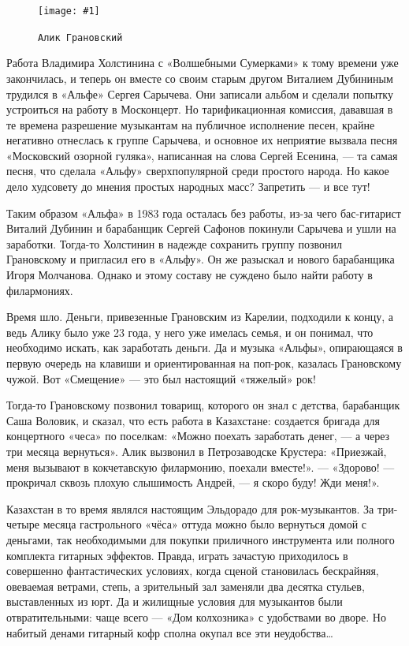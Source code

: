\documentclass[16pt,a5paper]{book}
\newcommand{\myincludegraphics}[1]{\texttt{[image: \#1]}}
\begin{document}
\begin{figure}
    \centering
    \myincludegraphics{Image09}
    \caption{\texttt{Алик Грановский}}
\end{figure}

Работа Владимира Холстинина с «Волшебными Сумерками» к тому времени уже закончилась, и теперь он вместе со своим старым
другом Виталием Дубининым трудился в «Альфе» Сергея Сарычева. Они записали альбом и сделали попытку устроиться на работу
в Москонцерт. Но тарификационная комиссия, дававшая в те времена разрешение музыкантам на публичное исполнение песен,
крайне негативно отнеслась к группе Сарычева, и основное их неприятие вызвала песня «Московский озорной гуляка»,
написанная на слова Сергей Есенина, — та самая песня, что сделала «Альфу» сверхпопулярной среди простого народа. Но
какое дело худсовету до мнения простых народных масс? Запретить — и все тут!

Таким образом «Альфа» в 1983 года осталась без работы, из-за чего бас-гитарист Виталий Дубинин и барабанщик Сергей
Сафонов покинули Сарычева и ушли на заработки. Тогда-то Холстинин в надежде сохранить группу позвонил Грановскому и
пригласил его в «Альфу». Он же разыскал и нового барабанщика Игоря Молчанова. Однако и этому составу не суждено было
найти работу в филармониях.

Время шло. Деньги, привезенные Грановским из Карелии, подходили к концу, а ведь Алику было уже 23 года, у него уже
имелась семья, и он понимал, что необходимо искать, как заработать деньги. Да и музыка «Альфы», опирающаяся в первую
очередь на клавиши и ориентированная на поп-рок, казалась Грановскому чужой. Вот «Смещение» — это был настоящий
«тяжелый» рок!

Тогда-то Грановскому позвонил товарищ, которого он знал с детства, барабанщик Саша Воловик, и сказал, что есть работа в
Казахстане: создается бригада для концертного «чеса» по поселкам: «Можно поехать заработать денег, — а через три месяца
вернуться». Алик вызвонил в Петрозаводске Крустера: «Приезжай, меня вызывают в кокчетавскую филармонию, поехали
вместе!». — «Здорово! — прокричал сквозь плохую слышимость Андрей, — я скоро буду! Жди меня!».

Казахстан в то время являлся настоящим Эльдорадо для рок-музыкантов. За три-четыре месяца гастрольного «чёса» оттуда
можно было вернуться домой с деньгами, так необходимыми для покупки приличного инструмента или полного комплекта
гитарных эффектов. Правда, играть зачастую приходилось в совершенно фантастических условиях, когда сценой становилась
бескрайняя, овеваемая ветрами, степь, а зрительный зал заменяли два десятка стульев, выставленных из юрт. Да и жилищные
условия для музыкантов были отвратительными: чаще всего — «Дом колхозника» с удобствами во дворе. Но набитый денами
гитарный кофр сполна окупал все эти неудобства\ldots
\end{document}
